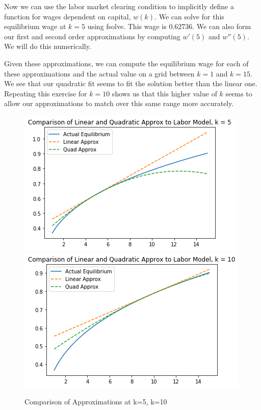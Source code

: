 \documentclass{article}
\begin{document}
	Now we can use the labor market clearing condition to implicitly define a function for wages dependent on capital, $w(k)$. We can solve for this equilibrium wage at $k=5$ using fsolve. This wage is 0.62736. We can also form our first and second order approximations by computing $w'(5)$ and $w''(5)$. We will do this numerically.
	
	Given these approximations, we can compute the equilibrium wage for each of these approximations and the actual value on a grid between $k=1$ and $k=15$. We see that our quadratic fit seems to fit the solution better than the linear one. Repeating this exercise for $k = 10$ shows us that this higher value of $k$ seems to allow our approximations to match over this same range more accurately.
	
	\begin{figure}[!h]
		\centering
		\caption{Comparison of Approximations at k=5, k=10}
		\includegraphics[scale = 0.5]{figP1}
		\includegraphics[scale = 0.5]{figP2}
	\end{figure}
	
	\newpage
\end{document}

